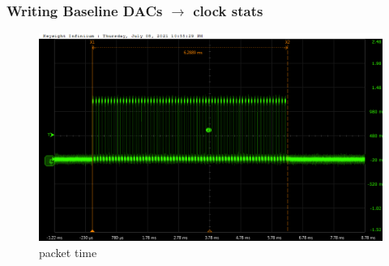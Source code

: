 \documentclass[aspectratio=169]{beamer}
\begin{document}
	\begin{frame}
	\frametitle{Writing Baseline DACs $\rightarrow$ clock stats}
	\begin{center}
		\begin{figure}
			\includegraphics[width=0.65 \textwidth]{IMG/probe/09-08-2021_packet-time.png}
			\caption{{\small packet time}}
		\end{figure}
		
		
	\end{center}
	\end{frame}
\end{document}
